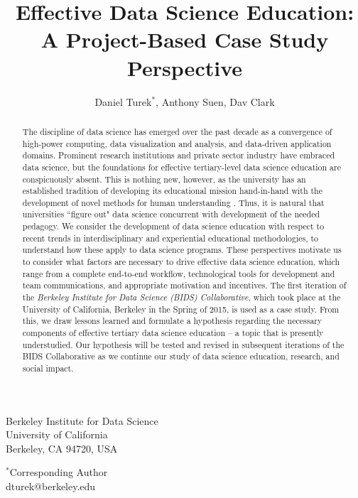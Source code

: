 \documentclass[12pt]{article}
\begin{document}
\title{Effective Data Science Education: \\
\large A Project-Based Case Study Perspective}

\author{Daniel Turek$^{*}$, Anthony Suen, Dav Clark}

\date{}

\maketitle

\vspace{0.4in}
\begin{center}

Berkeley Institute for Data Science \\
University of California \\
Berkeley, CA 94720, USA

\vspace{0.8in}

$^*$Corresponding Author \\
dturek@berkeley.edu
\end{center}

\thispagestyle{empty}
\newpage

\begin{abstract}
The discipline of data science has emerged over the past decade as a convergence of high-power computing, data visualization and analysis, and data-driven application domains.  Prominent research institutions and private sector industry have embraced data science, but the foundations for effective tertiary-level data science education are conspicuously absent. This is nothing new, however, as the university has an established tradition of developing its educational mission hand-in-hand with the development of novel methods for human understanding \citep{feingold_tradition_1991}. Thus, it is natural that universities ``figure out" data science concurrent with development of the needed pedagogy. We consider the development of data science education with respect to recent trends in interdisciplinary and experiential educational methodologies, to understand how these apply to data science programs. These perspectives motivate us to consider what factors are necessary to drive effective data science education, which range from a complete end-to-end workflow, technological tools for development and team communications, and appropriate motivation and incentives. The first iteration of the \emph{Berkeley Institute for Data Science (BIDS) Collaborative}, which took place at the University of California, Berkeley in the Spring of 2015, is used as a case study. From this, we draw lessons learned and formulate a hypothesis regarding the necessary components of effective tertiary data science education -- a topic that is presently understudied.  Our hypothesis will be tested and revised in subsequent iterations of the BIDS Collaborative as we continue our study of data science education, research, and social impact.
\end{abstract}
\end{document}

